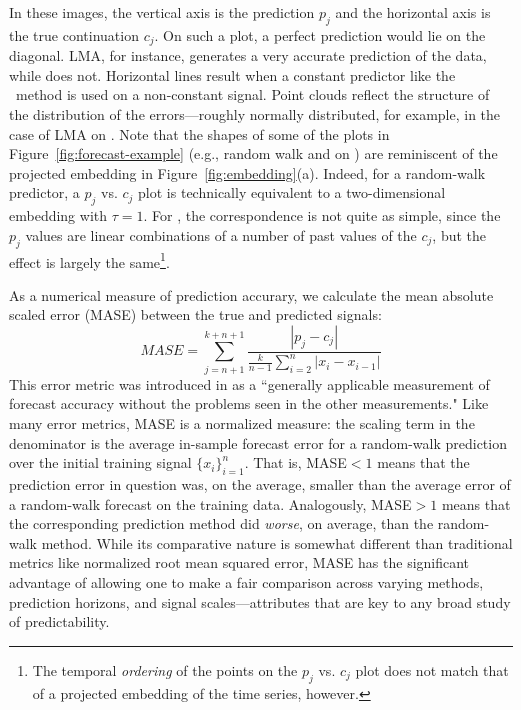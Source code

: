 In these images, the vertical axis is the prediction $p_j$ and the
horizontal axis is the true continuation $c_j$.  On such a plot, a
perfect prediction would lie on the diagonal.  LMA, for instance,
generates a very accurate prediction of the \col data, while \arima
does not.  Horizontal lines result when a constant predictor like the
\naive ~method is used on a non-constant signal.  Point clouds reflect
the structure of the distribution of the errors---roughly normally
distributed, for example, in the case of LMA on \gcc.  Note that the
shapes of some of the plots in Figure~\ref{fig:forecast-example}
(e.g., random walk and \arima on \col) are reminiscent of the
projected embedding in Figure~\ref{fig:embedding}(a).  Indeed, for a
random-walk predictor, a $p_j$ vs. $c_j$ plot is technically
equivalent to a two-dimensional embedding with $\tau=1$.  For \arima,
the correspondence is not quite as simple, since the $p_j$ values are
linear combinations of a number of past values of the $c_j$, but the
effect is largely the same\footnote{The temporal \emph{ordering} of
  the points on the \arima $p_j$ vs. $c_j$ plot does not match that of
  a projected embedding of the time series, however.}.

As a numerical measure of prediction accurary, we calculate the mean
absolute scaled error (MASE) between the true and predicted signals:
%
$$MASE = \sum_{j=n+1}^{k+n+1}\frac{|p_j-c_j|
}{\frac{k}{n-1}\sum^n_{i=2}|x_{i}-x_{i-1}|}$$
%
This error metric was introduced in \cite{MASE} as a ``generally
applicable measurement of forecast accuracy without the problems seen
in the other measurements."  Like many error metrics, MASE is a
normalized measure: the scaling term in the denominator
%
%
is the average in-sample forecast error for a random-walk prediction
over the initial training signal $\{x_i\}^n_{i=1}$.  That is, MASE$<1$
means that the prediction error in question was, on the average,
smaller than the average error of a random-walk forecast on the
training data.  Analogously, MASE$>1$ means that the corresponding
prediction method did \emph{worse}, on average, than the random-walk
method.  While its comparative nature is somewhat different than
traditional metrics like normalized root mean squared error, MASE has
the significant advantage of allowing one to make a fair comparison
across varying methods, prediction horizons, and signal
scales---attributes that are key to any broad study of predictability.

